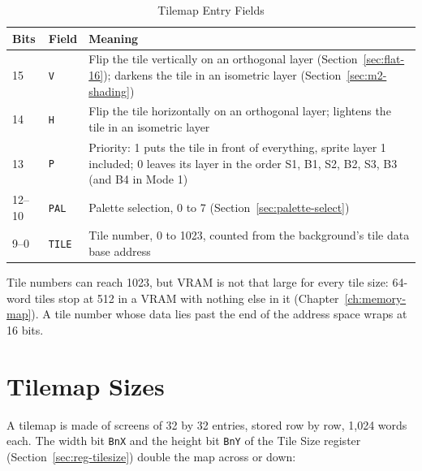 \begin{table}[H]
	\centering
	\begin{tabular}{llp{7.5cm}}
		\toprule
		\textbf{Bits} & \textbf{Field} & \textbf{Meaning}                                                                                                                                     \\
		\midrule
		15            & \texttt{V}     & Flip the tile vertically on an orthogonal layer (Section~\ref{sec:flat-16}); darkens the tile in an isometric layer (Section~\ref{sec:m2-shading})   \\
		14            & \texttt{H}     & Flip the tile horizontally on an orthogonal layer; lightens the tile in an isometric layer                                                           \\
		13            & \texttt{P}     & Priority: 1 puts the tile in front of everything, sprite layer 1 included; 0 leaves its layer in the order S1, B1, S2, B2, S3, B3 (and B4 in Mode 1) \\
		12--10        & \texttt{PAL}   & Palette selection, 0 to 7 (Section~\ref{sec:palette-select})                                                                                         \\
		9--0          & \texttt{TILE}  & Tile number, 0 to 1023, counted from the background's tile data base address                                                                         \\
		\bottomrule
	\end{tabular}
	\caption{Tilemap Entry Fields}
	\label{tab:tilemap-entry-fields}
\end{table}

Tile numbers can reach 1023, but VRAM is not that large for every tile size: 64-word tiles stop at 512 in a VRAM with
nothing else in it (Chapter~\ref{ch:memory-map}). A tile number whose data lies past the end of the address space wraps
at 16 bits.

\section{Tilemap Sizes}
\label{sec:tilemap-size}

A tilemap is made of screens of 32 by 32 entries, stored row by row, 1,024 words each. The width bit \texttt{BnX} and
the height bit \texttt{BnY} of the Tile Size register (Section~\ref{sec:reg-tilesize}) double the map across or down:

